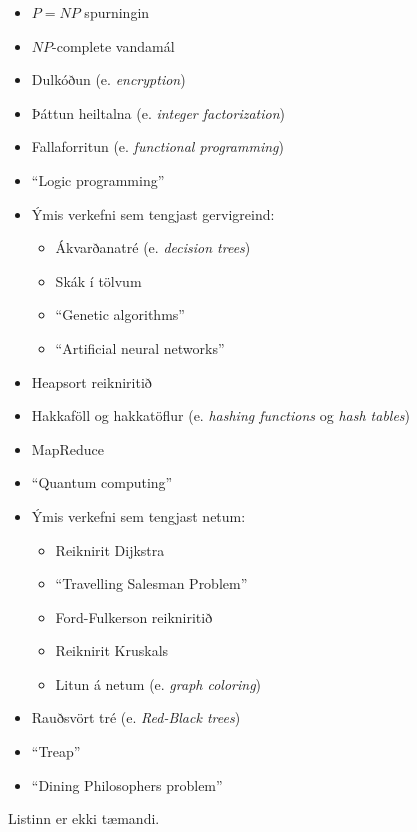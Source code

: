 \documentclass{article}
\begin{document}
\begin{itemize}
 \item $P = NP$ spurningin
 \item $NP$-complete vandamál
 \item Dulkóðun (e. \emph{encryption})
 \item Þáttun heiltalna (e. \emph{integer factorization}) 
 \item Fallaforritun (e. \emph{functional programming})
 \item ``Logic programming''
 \item Ýmis verkefni sem tengjast gervigreind:
 \begin{itemize}
  \item Ákvarðanatré (e. \emph{decision trees})
  \item Skák í tölvum
  \item ``Genetic algorithms''
  \item ``Artificial neural networks''
 \end{itemize}
 \item Heapsort reikniritið
 \item Hakkaföll og hakkatöflur (e. \emph{hashing functions} og \emph{hash tables})
 \item MapReduce
 \item ``Quantum computing''
 \item Ýmis verkefni sem tengjast netum:
 \begin{itemize}
  \item Reiknirit Dijkstra
  \item ``Travelling Salesman Problem''
  \item Ford-Fulkerson reikniritið
  \item Reiknirit Kruskals
  \item Litun á netum (e. \emph{graph coloring})
 \end{itemize}
 \item Rauðsvört tré (e. \emph{Red-Black trees})
 \item ``Treap''
 \item ``Dining Philosophers problem''
\end{itemize}
Listinn er ekki tæmandi.
\end{document}
